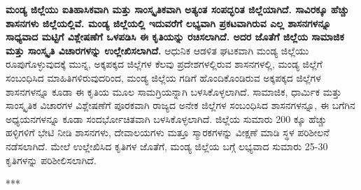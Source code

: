 \textbf{ಮಂಡ್ಯ ಜಿಲ್ಲೆಯು ಐತಿಹಾಸಿಕವಾಗಿ ಮತ್ತು ಸಾಂಸ್ಕೃತಿಕವಾಗಿ ಅತ್ಯಂತ ಸಂಪದ್ಭರಿತ ಜಿಲ್ಲೆಯಾಗಿದೆ. ಸಾವಿರಕ್ಕೂ ಹೆಚ್ಚು ಶಾಸನಗಳು ಜಿಲ್ಲೆಯಲ್ಲಿವೆ. ಮಂಡ್ಯ ಜಿಲ್ಲೆಯಲ್ಲಿ ಇದುವರೆಗೆ ಲಭ್ಯವಾಗಿ ಪ್ರಕಟವಾಗಿರುವ ಎಲ್ಲ ಶಾಸನಗಳನ್ನೂ ಸಾಧ್ಯವಾದ ಮಟ್ಟಿಗೆ ವಿಶ್ಲೇಷಣೆಗೆ ಒಳಪಡಿಸಿ ಈ ಕೃತಿಯನ್ನು ರಚಿಸಲಾಗಿದೆ. ಅದರ ಜೊತೆಗೆ ಜಿಲ್ಲೆಯ ಸಾಮಾಜಿಕ ಮತ್ತು ಸಾಂಸ್ಕೃತಿ ವಿಚಾರಗಳನ್ನು ಉಲ್ಲೇಖಿಸಲಾಗಿದೆ. } ಆಧುನಿಕ ಆಡಳಿತ ಘಟಕವಾಗಿ ಮಂಡ್ಯ ಜಿಲ್ಲೆಯು ರೂಪುಗೊಳ್ಳುವುದಕ್ಕೆ ಮುನ್ನ, ಅಕ್ಕಪಕ್ಕದ ಜಿಲ್ಲೆಗಳ ಕೆಲವು ಪ್ರದೇಶಗಳಲ್ಲಿರುವ ಶಾಸನಗಳಲ್ಲಿ, ಮಂಡ್ಯ ಜಿಲ್ಲೆಗೆ ಸಂಬಂಧಿಸಿದ ಮಾಹಿತಿಗಳಿರುವುದರಿಂದ, ಮಂಡ್ಯ ಜಿಲ್ಲೆಯ ಗಡಿಗೆ ಹೊಂದಿಕೊಂಡಿರುವ ಅಕ್ಕಪಕ್ಕದ ಜಿಲ್ಲೆಗಳ ಶಾಸನಗಳನ್ನೂ ಕೂಡಾ ಈ ಕೃತಿಯ ಮೂಲ ಸಾಮಗ್ರಿಯನ್ನಾಗಿ ಬಳಸಿಕೊಳ್ಳಲಾಗಿದೆ. ಸಾಮಾಜಿಕ, ಧಾರ್ಮಿಕ ಮತ್ತು ಸಾಂಸ್ಕೃತಿಕ ವಿಚಾರಗಳ ವಿಶ್ಲೇಷಣೆಗೆ ಪೂರಕವಾಗಿ ರಾಜ್ಯದ ಅನೇಕ ಜಿಲ್ಲೆಗಳ ಸಂಬಂಧಿಸಿದ ಶಾಸನಗಳನ್ನೂ, ಈ ಬಗೆಗಿನ ಅಧ್ಯಯನಗಳನ್ನೂ ಕೂಡಾ ಸಂದರ್ಭೋಚಿತವಾಗಿ ಬಳಸಿಕೊಳ್ಳಲಾಗಿದೆ. ಜಿಲ್ಲೆಯ ಸುಮಾರು 200 ಕ್ಕೂ ಹೆಚ್ಚು ಹಳ್ಳಿಗಳಿಗೆ ಭೇಟಿ ನೀಡಿ ಶಾಸನಗಳು, ದೇವಾಲಯಗಳು ಮತ್ತೂ ಸ್ಮಾರಕಗಳನ್ನು ವೀಕ್ಷಣೆ ಮಾಡಿ ಸ್ಥಳ ಪರಿಶೀಲನೆ ನಡೆಸಲಾಗಿದೆ. ಮೇಲೆ ಉಲ್ಲೇಖಿಸಿದ ಕೃತಿಗಳ ಜೊತೆಗೆ, ಮಂಡ್ಯ ಜಿಲ್ಲೆಯ ಬಗ್ಗೆ ಲಭ್ಯವಾದ ಸುಮಾರು 25-30 ಕೃತಿಗಳನ್ನು ಪರಿಶೀಲಿಸಲಾಗಿದೆ.

\begin{center}
***
\end{center}

\theendnotes

